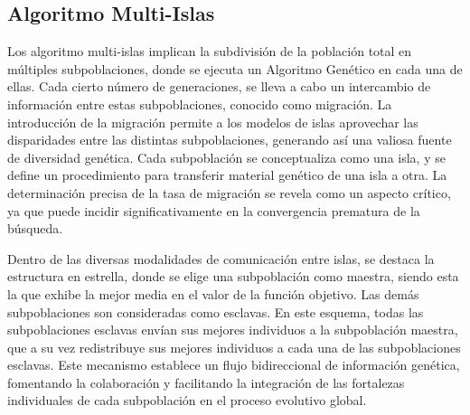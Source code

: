 \FloatBarrier
\subsection{Algoritmo Multi-Islas}
Los algoritmo multi-islas implican la subdivisión de la población total en múltiples subpoblaciones, donde se ejecuta un Algoritmo Genético en cada una de ellas. Cada cierto número de generaciones, se lleva a cabo un intercambio de información entre estas subpoblaciones, conocido como migración. La introducción de la migración permite a los modelos de islas aprovechar las disparidades entre las distintas subpoblaciones, generando así una valiosa fuente de diversidad genética. Cada subpoblación se conceptualiza como una isla, y se define un procedimiento para transferir material genético de una isla a otra. La determinación precisa de la tasa de migración se revela como un aspecto crítico, ya que puede incidir significativamente en la convergencia prematura de la búsqueda.

Dentro de las diversas modalidades de comunicación entre islas, se destaca la estructura en estrella, donde se elige una subpoblación como maestra, siendo esta la que exhibe la mejor media en el valor de la función objetivo. Las demás subpoblaciones son consideradas como esclavas. En este esquema, todas las subpoblaciones esclavas envían sus mejores individuos a la subpoblación maestra, que a su vez redistribuye sus mejores individuos a cada una de las subpoblaciones esclavas. Este mecanismo establece un flujo bidireccional de información genética, fomentando la colaboración y facilitando la integración de las fortalezas individuales de cada subpoblación en el proceso evolutivo global.